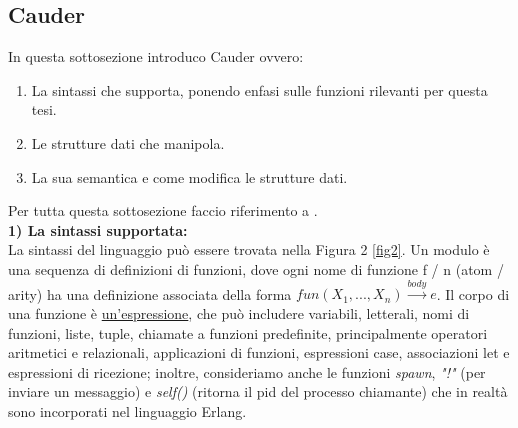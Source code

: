 \documentclass[background.tex]{subfiles}
\begin{document}
\subsection{Cauder}
In questa sottosezione introduco Cauder ovvero: 
	\begin{enumerate}
		\item La sintassi che supporta, ponendo enfasi sulle funzioni rilevanti per questa tesi.
		\item Le strutture dati che manipola.
		\item La sua semantica e come modifica le strutture dati.
	\end{enumerate}
Per tutta questa sottosezione faccio riferimento a \cite{lanese19}.\\
\textbf{1) La sintassi supportata:}\\
La sintassi del linguaggio può essere trovata nella Figura 2 \ref{fig2}. Un modulo è una sequenza di definizioni di funzioni, dove ogni nome di funzione f / n (atom / arity) ha una definizione associata della forma $\displaystyle fun (X_{1},..., X_{n}) \xrightarrow{body} e$.
Il corpo di una funzione è \underline{un'espressione}, che può includere variabili, letterali, nomi di funzioni, liste, tuple, chiamate a funzioni predefinite, principalmente operatori aritmetici e relazionali, applicazioni di funzioni, espressioni case, associazioni let e espressioni di ricezione; inoltre, consideriamo anche le funzioni \textit{spawn}, \textit{"!"} (per inviare un messaggio) e \textit{self()} (ritorna il pid del processo chiamante) che in realtà sono incorporati nel linguaggio Erlang.
\end{document}
